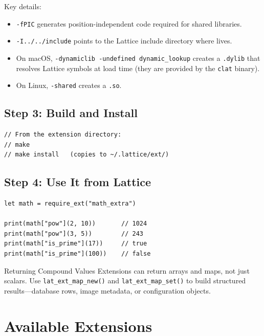 Key details:
\begin{itemize}
  \item \lstinline|-fPIC| generates position-independent code required for shared libraries.
  \item \lstinline|-I../../include| points to the Lattice include directory where  lives.
  \item On macOS, \lstinline|-dynamiclib -undefined dynamic_lookup| creates a \lstinline|.dylib| that resolves Lattice symbols at load time (they are provided by the \lstinline|clat| binary).
  \item On Linux, \lstinline|-shared| creates a \lstinline|.so|.
\end{itemize}

\subsection{Step 3: Build and Install}

\begin{lstlisting}[language=Lattice, caption={Building and installing an extension}]
// From the extension directory:
// make
// make install   (copies to ~/.lattice/ext/)
\end{lstlisting}

\subsection{Step 4: Use It from Lattice}

\begin{lstlisting}[language=Lattice, caption={Using the math\_extra extension}]
let math = require_ext("math_extra")

print(math["pow"](2, 10))       // 1024
print(math["pow"](3, 5))        // 243
print(math["is_prime"](17))     // true
print(math["is_prime"](100))    // false
\end{lstlisting}

\begin{tipbox}{Returning Compound Values}
Extensions can return arrays and maps, not just scalars.
Use \lstinline|lat_ext_map_new()| and \lstinline|lat_ext_map_set()| to build structured results---database rows, image metadata, or configuration objects.
\end{tipbox}


\section{Available Extensions}\label{sec:available-extensions}

